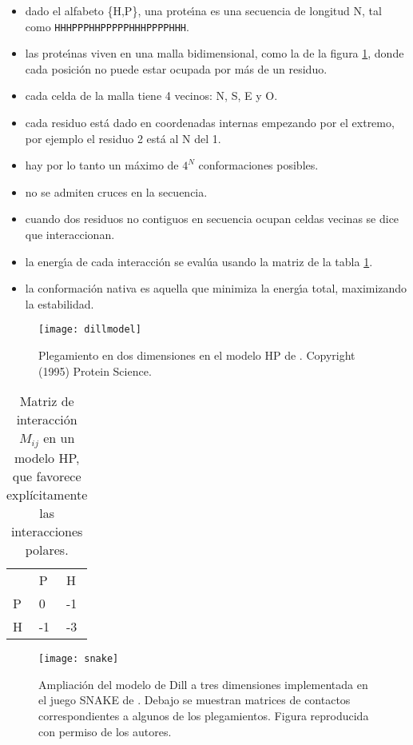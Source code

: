 \begin{itemize}
\item dado el alfabeto \{H,P\}, una prote\'\i{}na es una secuencia de longitud N, 
tal como \texttt{HHHPPPHHPPPPPHHHPPPPHHH}.
\item las prote\'\i{}nas viven en una malla bidimensional, como la de la figura \ref{fig:dillmodel}, donde cada posici\'{o}n no
puede estar ocupada por m\'{a}s de un residuo.
\item cada celda de la malla tiene 4 vecinos: N, S, E y O.
\item cada residuo est\'{a} dado en coordenadas internas empezando por el extremo, por ejemplo el residuo 2 est\'{a} al N del 1.
\item hay por lo tanto un m\'{a}ximo de $4^{N}$ conformaciones posibles.
\item no se admiten cruces en la secuencia.
\item cuando dos residuos no contiguos en secuencia ocupan celdas vecinas se dice que interaccionan.
\item la energ\'\i{}a de cada interacci\'{o}n se eval\'{u}a usando la matriz de la tabla \ref{tab:matrizHP}.
\item la conformaci\'{o}n nativa es aquella que minimiza la energ\'\i{}a total, maximizando la estabilidad. %
\end{itemize}

\begin{figure}
\begin{center} 
\texttt{[image: dillmodel]}
\caption%
{
Plegamiento en dos dimensiones en el modelo HP de \citet{Dill1995}. Copyright (1995) Protein Science.
}
\label{fig:dillmodel}
\end{center}
\end{figure}

\begin{table}[h]
\begin{center}
\begin{tabular}{|l|l|l|}\hline
 & P & H\\   
P & 0 & -1\\
H & -1 & -3\\ 
\end{tabular}
\end{center}
\caption%
{Matriz de interacci\'{o}n $M_{ij}$ en un modelo HP, que favorece expl\'{i}citamente las interacciones polares.}
\label{tab:matrizHP}
\end{table} 

\begin{figure}
\begin{center} 
\texttt{[image: snake]}
\caption%
{
Ampliaci\'{o}n del modelo de Dill a tres dimensiones implementada en el juego SNAKE de \citet{Nido2016}.
Debajo se muestran matrices de contactos correspondientes a algunos de los plegamientos. 
Figura reproducida con permiso de los autores.
}
\label{fig:snakefold}
\end{center}
\end{figure}


